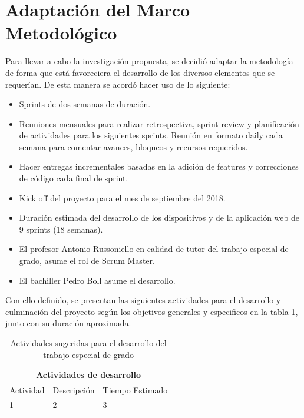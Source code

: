 \section{Adaptación del Marco Metodológico}
Para llevar a cabo la investigación propuesta, se decidió adaptar la metodología de forma que está favoreciera el desarrollo de los diversos elementos que se requerían. De esta manera se acordó hacer uso de lo siguiente:
\begin{itemize}
\item Sprints de dos semanas de duración.
\item Reuniones mensuales para realizar retrospectiva, sprint review y planificación de actividades para los siguientes sprints. Reunión en formato daily cada semana para comentar avances, bloqueos y recursos requeridos.  
\item Hacer entregas incrementales basadas en la adición de features y correcciones de código cada final de sprint.
\item Kick off del proyecto para el mes de septiembre del 2018.
\item Duración estimada del desarrollo de los dispositivos y de la aplicación web de 9 sprints (18 semanas).
\item El profesor Antonio Russoniello en calidad de tutor del trabajo especial de grado, asume el rol de Scrum Master. 
\item El bachiller Pedro Boll asume el desarrollo. 
\end{itemize}
Con ello definido, se presentan las siguientes actividades para el desarrollo y culminación del proyecto según los objetivos generales y especificos en la  tabla \ref{tabla:actividades_desarrollo}, junto con su duración aproximada.

\begin{table}[!htb]
\centering
\begin{tabular}{| m{4.5cm}| m{6.6cm}| m{3.2cm}|}
\hline
\multicolumn{3}{|c|}{Actividades de desarrollo} \\
\hline 
\centering Actividad & \centering Descripción & \centering Tiempo Estimado \tabularnewline \hline
1 & 2 & 3 \\ \hline
\end{tabular}
\caption{Actividades sugeridas para el desarrollo del trabajo especial de grado}
\label{tabla:actividades_desarrollo}
\end{table}
 